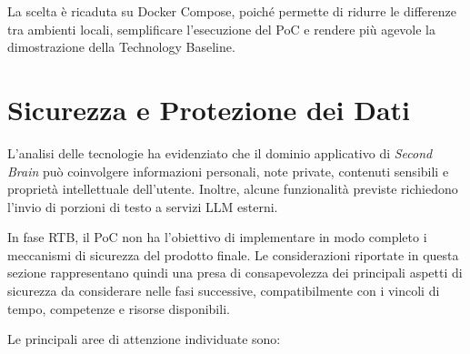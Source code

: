 La scelta è ricaduta su Docker Compose, poiché permette di ridurre le differenze tra ambienti
locali, semplificare l'esecuzione del PoC e rendere più agevole la dimostrazione della Technology
Baseline.

\section{Sicurezza e Protezione dei Dati}

L'analisi delle tecnologie ha evidenziato che il dominio applicativo di \textit{Second Brain}
può coinvolgere informazioni personali, note private, contenuti sensibili e proprietà
intellettuale dell'utente. Inoltre, alcune funzionalità previste richiedono l'invio di porzioni
di testo a servizi LLM esterni.

In fase RTB, il PoC non ha l'obiettivo di implementare in modo completo i meccanismi di
sicurezza del prodotto finale. Le considerazioni riportate in questa sezione rappresentano
quindi una presa di consapevolezza dei principali aspetti di sicurezza da considerare nelle
fasi successive, compatibilmente con i vincoli di tempo, competenze e risorse disponibili.

Le principali aree di attenzione individuate sono:

